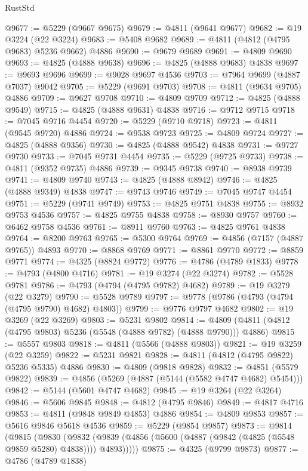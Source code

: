 \begin{lexlean}{RustStd}
\begin{coremodule}
@9677 := @5229 (@9667 @9675)
@9679 := @4811 (@9641 @9677)
@9682 := @19 @3224 (@22 @3224)
@9683 := @5408 @9682
@9689 := @4811 (@4812 (@4795 @9683) @5236 @9662) @4886
@9690 := @9679 @9689
@9691 := @4809 @9690
@9693 := @4825 (@4888 @9638)
@9696 := @4825 (@4888 @9683) @4838
@9697 := @9693 @9696
@9699 := @9028 @9697 @4536
@9703 := @7964 @9699 (@4887 @7037) @9042
@9705 := @5229 (@9691 @9703)
@9708 := @4811 (@9634 @9705) @4886
@9709 := @9627 @9708
@9710 := @4809 @9709
@9712 := @4825 (@4888 @9549)
@9715 := @4825 (@4888 @9631) @4838
@9716 := @9712 @9715
@9718 := @7045 @9716 @4454
@9720 := @5229 (@9710 @9718)
@9723 := @4811 (@9545 @9720) @4886
@9724 := @9538 @9723
@9725 := @4809 @9724
@9727 := @4825 (@4888 @9356)
@9730 := @4825 (@4888 @9542) @4838
@9731 := @9727 @9730
@9733 := @7045 @9731 @4454
@9735 := @5229 (@9725 @9733)
@9738 := @4811 (@9352 @9735) @4886
@9739 := @9345 @9738
@9740 := @8938 @9739
@9741 := @4809 @9740
@9743 := @4825 (@4888 @8942)
@9746 := @4825 (@4888 @9349) @4838
@9747 := @9743 @9746
@9749 := @7045 @9747 @4454
@9751 := @5229 (@9741 @9749)
@9753 := @4825 @9751 @4838
@9755 := @8932 @9753 @4536
@9757 := @4825 @9755 @4838
@9758 := @8930 @9757
@9760 := @6462 @9758 @4536
@9761 := @8911 @9760
@9763 := @4825 @9761 @4838
@9764 := @8200 @9763
@9765 := @5300 @9764
@9769 := @4856 (@7157 (@4887 @9765)) @4893
@9770 := @8868 @9769
@9771 := @8861 @9770
@9772 := @8859 @9771
@9774 := @4325 (@8824 @9772)
@9776 := @4786 (@4789 @1833)
@9778 := @4793 (@4800 @4716)
@9781 := @19 @3274 (@22 @3274)
@9782 := @5528 @9781
@9786 := @4793 (@4794 (@4795 @9782) @4682)
@9789 := @19 @3279 (@22 @3279)
@9790 := @5528 @9789
@9797 := @9778 (@9786 (@4793 (@4794 (@4795 @9790) @4682) @4803))
@9799 := @9776 @9797 @4682
@9802 := @19 @3269 (@22 @3269)
@9803 := @5231 @9802
@9814 := @4809 (@4811 (@4812 (@4795 @9803) @5236 (@5548 (@4888 @9782) (@4888 @9790))) @4886)
@9815 := @5557 @9803
@9818 := @4811 (@5566 (@4888 @9803))
@9821 := @19 @3259 (@22 @3259)
@9822 := @5231 @9821
@9828 := @4811 (@4812 (@4795 @9822) @5236 @5335) @4886
@9830 := @4809 (@9818 @9828)
@9832 := @4851 (@5579 @9822)
@9839 := @4856 (@5269 (@4887 (@5144 (@5582 @4747 @4682) @5454)))
@9842 := @5144 (@5601 @4747 @4682)
@9845 := @19 @3264 (@22 @3264)
@9846 := @5606 @9845
@9848 := @4812 (@4795 @9846)
@9849 := @4817 @4716
@9853 := @4811 (@9848 @9849 @4853) @4886
@9854 := @4809 @9853
@9857 := @5616 @9846 @5618 @4536
@9859 := @5229 (@9854 @9857)
@9873 := @9814
    (@9815
      (@9830
        (@9832 (@9839 (@4856 (@5600 (@4887 (@9842 (@4825 (@5548 @9859 @5280) @4838)))) @4893)))))
@9875 := @4325 (@9799 @9873)
@9877 := @4786 (@4789 @1838)

\end{coremodule}
\end{lexlean}
